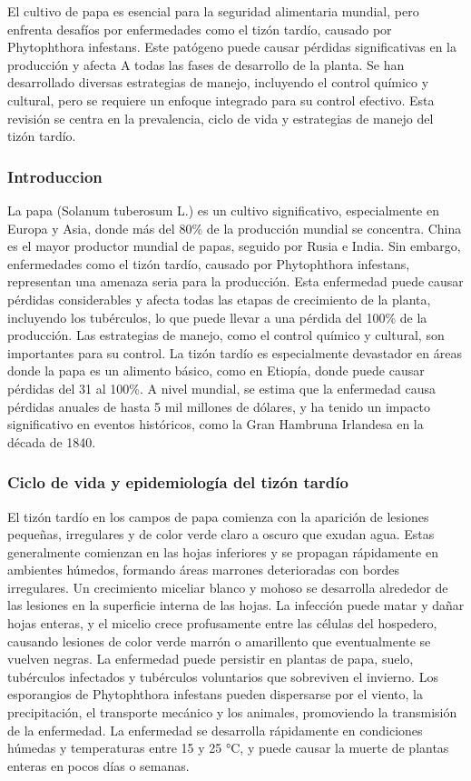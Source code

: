 El cultivo de papa es esencial para la seguridad alimentaria mundial, pero enfrenta desafíos por enfermedades como el tizón tardío, causado por Phytophthora infestans. Este patógeno puede causar pérdidas significativas en la producción y afecta A todas las fases de desarrollo de la planta. Se han desarrollado diversas estrategias de manejo, incluyendo el control químico y cultural, pero se requiere un enfoque integrado para su control efectivo. Esta revisión se centra en la prevalencia, ciclo de vida y estrategias de manejo del tizón tardío.

\subsubsection{Introduccion}
La papa (Solanum tuberosum L.) es un cultivo significativo, especialmente en Europa y Asia, donde más del 80\% de la producción mundial se concentra. China es el mayor productor mundial de papas, seguido por Rusia e India. Sin embargo, enfermedades como el tizón tardío, causado por Phytophthora infestans, representan una amenaza seria para la producción. Esta enfermedad puede causar pérdidas considerables y afecta todas las etapas de crecimiento de la planta, incluyendo los tubérculos, lo que puede llevar a una pérdida del 100\% de la producción. Las estrategias de manejo, como el control químico y cultural, son importantes para su control. La tizón tardío es especialmente devastador en áreas donde la papa es un alimento básico, como en Etiopía, donde puede causar pérdidas del 31 al 100\%. A nivel mundial, se estima que la enfermedad causa pérdidas anuales de hasta 5 mil millones de dólares, y ha tenido un impacto significativo en eventos históricos, como la Gran Hambruna Irlandesa en la década de 1840.

\subsubsection{Ciclo de vida y epidemiología del tizón tardío}
El tizón tardío en los campos de papa comienza con la aparición de lesiones pequeñas, irregulares y de color verde claro a oscuro que exudan agua. Estas generalmente comienzan en las hojas inferiores y se propagan rápidamente en ambientes húmedos, formando áreas marrones deterioradas con bordes irregulares. Un crecimiento miceliar blanco y mohoso se desarrolla alrededor de las lesiones en la superficie interna de las hojas. La infección puede matar y dañar hojas enteras, y el micelio crece profusamente entre las células del hospedero, causando lesiones de color verde marrón o amarillento que eventualmente se vuelven negras. La enfermedad puede persistir en plantas de papa, suelo, tubérculos infectados y tubérculos voluntarios que sobreviven el invierno. Los esporangios de Phytophthora infestans pueden dispersarse por el viento, la precipitación, el transporte mecánico y los animales, promoviendo la transmisión de la enfermedad. La enfermedad se desarrolla rápidamente en condiciones húmedas y temperaturas entre 15 y 25 °C, y puede causar la muerte de plantas enteras en pocos días o semanas.

